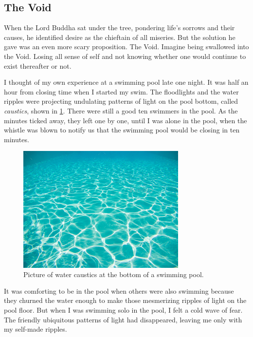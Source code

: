 \documentclass[
  a4paper,
]{article}
\begin{document}
\hypertarget{the-void}{%
\subsection{The Void}\label{the-void}}

When the Lord Buddha sat under the tree, pondering life's sorrows and
their causes, he identified desire as the chieftain of all miseries. But
the solution he gave was an even more scary proposition. The Void.
Imagine being swallowed into the Void. Losing all sense of self and not
knowing whether one would continue to exist thereafter or not.

I thought of my own experience at a swimming pool late one night. It was
half an hour from closing time when I started my swim. The floodlights
and the water ripples were projecting undulating patterns of light on
the pool bottom, called \emph{caustics}, shown in
\cref{fig:water-caustic}. There were still a good ten swimmers in the
pool. As the minutes ticked away, they left one by one, until I was
alone in the pool, when the whistle was blown to notify us that the
swimming pool would be closing in ten minutes.

\begin{figure}
\hypertarget{fig:water-caustic}{%
\centering
\includegraphics[width=0.75\textwidth,height=\textheight]{images/water-caustic.jpg}
\caption[Picture of water caustics at the bottom of a swimming
pool.]{Picture of water caustics at the bottom of a swimming
pool.\footnotemark{}}\label{fig:water-caustic}
}
\end{figure}

It was comforting to be in the pool when others were also swimming
because they churned the water enough to make those mesmerizing ripples
of light on the pool floor. But when I was swimming solo in the pool, I
felt a cold wave of fear. The friendly ubiquitous patterns of light had
disappeared, leaving me only with my self-made ripples.
\end{document}
